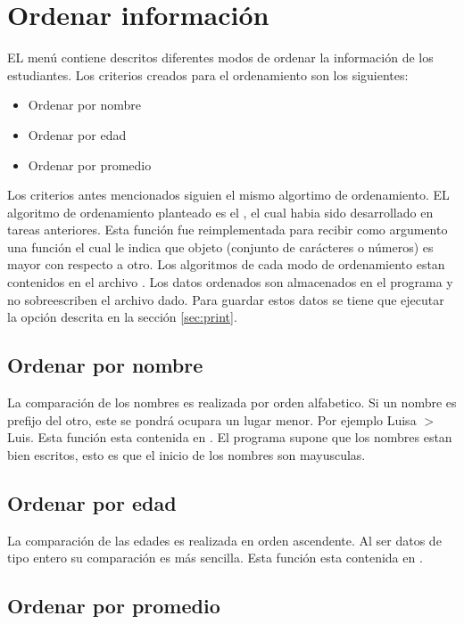 \section{Ordenar información}

EL menú contiene descritos diferentes modos de ordenar la información de los estudiantes. Los criterios creados para el ordenamiento son los siguientes:

\begin{itemize}
    \item Ordenar por nombre
    \item Ordenar por edad
    \item Ordenar por promedio
\end{itemize}

Los criterios antes mencionados siguien el mismo algortimo de ordenamiento. EL algoritmo de ordenamiento planteado es el , el cual habia sido desarrollado en tareas anteriores. Esta función fue reimplementada para recibir como argumento una función el cual le indica que objeto (conjunto de carácteres o números) es mayor con respecto a otro. Los algoritmos de cada modo de ordenamiento estan contenidos en el archivo . Los datos ordenados son almacenados en el programa y no sobreescriben el archivo dado. Para guardar estos datos se tiene que ejecutar la opción descrita en la sección \ref{sec:print}.

\subsection{Ordenar por nombre}

La comparación de los nombres es realizada por orden alfabetico. Si un nombre es prefijo del otro, este se pondrá ocupara un lugar menor. Por ejemplo Luisa $>$ Luis. Esta función esta contenida en . El programa supone que los nombres estan bien escritos, esto es que el inicio de los nombres son mayusculas.

\subsection{Ordenar por edad}

La comparación de las edades es realizada en orden ascendente. Al ser datos de tipo entero su comparación es más sencilla. Esta función esta contenida en .

\subsection{Ordenar por promedio}

